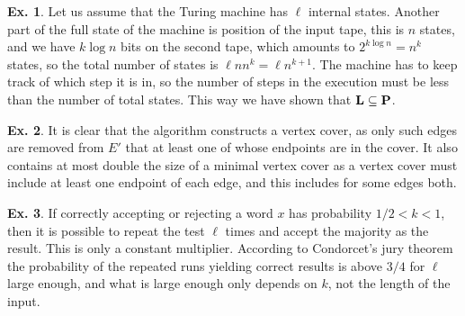 \documentclass[a4paper,12pt]{article}
\def\e{\mathrm{e}}
\theoremstyle{definition}
\newtheorem{exercise}{Ex.}[section]
\begin{document}
\begin{exercise}
 Let us assume that the Turing machine has $\ell$ internal states. Another part of the full state of the machine is position of the input tape, this is $n$ states, and we have $k\log n$ bits on the second tape, which amounts to $2^{k\log n} = n^k$ states, so the total number of states is $\ell n n^k = \ell n^{k+1}$. The machine has to keep track of which step it is in, so the number of steps in the execution must be less than the number of total states. This way we have shown that ${\bf L}\subseteq {\bf P}$.
\end{exercise}

\begin{exercise}
 It is clear that the algorithm constructs a vertex cover, as only such edges are removed from $E'$ that at least one of whose endpoints are in the cover. It also contains at most double the size of a minimal vertex cover as a vertex cover must include at least one endpoint of each edge, and this includes for some edges both.
\end{exercise}

\begin{exercise}
 If correctly accepting or rejecting a word $x$ has probability $1/2 < k < 1$, then it is possible to repeat the test $\ell$ times and accept the majority as the result. This is only a constant multiplier. According to Condorcet's jury theorem the probability of the repeated runs yielding correct results is above $3/4$ for $\ell$ large enough, and what is large enough only depends on $k$, not the length of the input.
\end{exercise}
\end{document}
